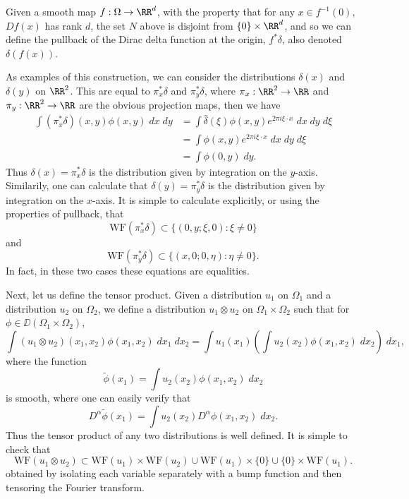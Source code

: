 \begin{example}
    Given a smooth map $f: \Omega \to \RR^d$, with the property that for any $x \in f^{-1}(0)$, $Df(x)$ has rank $d$, the set $N$ above is disjoint from $\{ 0 \} \times \RR^d$, and so we can define the pullback of the Dirac delta function at the origin, $f^* \delta$, also denoted $\delta(f(x))$.

    As examples of this construction, we can consider the distributions $\delta(x)$ and $\delta(y)$ on $\RR^2$. This are equal to $\pi_x^* \delta$ and $\pi_y^* \delta$, where $\pi_x: \RR^2 \to \RR$ and $\pi_y: \RR^2 \to \RR$ are the obvious projection maps, then we have
    \begin{align*}
        \int (\pi_x^* \delta)(x,y) \phi(x,y)\; dx\; dy &= \int \widehat{\delta}(\xi) \phi(x,y) e^{2 \pi i \xi \cdot x}\; dx\; dy\; d\xi\\
        &= \int \phi(x,y) e^{2 \pi i \xi \cdot x}\; dx\; dy\; d\xi\\
        &= \int \phi(0,y)\; dy.
    \end{align*}
    Thus $\delta(x) = \pi_x^* \delta$ is the distribution given by integration on the $y$-axis. Similarily, one can calculate that $\delta(y) = \pi_y^* \delta$ is the distribution given by integration on the $x$-axis. It is simple to calculate explicitly, or using the properties of pullback, that
    \[ \text{WF}(\pi_x^* \delta) \subset \{ (0,y;\xi,0) : \xi \neq 0 \} \]
    and
    \[ \text{WF}(\pi_y^* \delta) \subset \{ (x,0;0,\eta): \eta \neq 0 \}. \]
    In fact, in these two cases these equations are equalities.
\end{example}

Next, let us define the tensor product. Given a distribution $u_1$ on $\Omega_1$ and a distribution $u_2$ on $\Omega_2$, we define a distribution $u_1 \otimes u_2$ on $\Omega_1 \times \Omega_2$ such that for $\phi \in \DD(\Omega_1 \times \Omega_2)$,
%
\[ \int (u_1 \otimes u_2)(x_1,x_2) \phi(x_1,x_2)\; dx_1\; dx_2 = \int u_1(x_1) \left( \int u_2(x_2) \phi(x_1,x_2)\; dx_2 \right)\; dx_1, \]
%
where the function
%
\[ \tilde{\phi}(x_1) = \int u_2(x_2) \phi(x_1,x_2)\; dx_2 \]
%
is smooth, where one can easily verify that
%
\[ D^\alpha \tilde{\phi}(x_1) = \int u_2(x_2) D^\alpha \phi(x_1,x_2)\; dx_2. \]
%
Thus the tensor product of any two distributions is well defined. It is simple to check that
%
\[ \text{WF}(u_1 \otimes u_2) \subset \text{WF}(u_1) \times \text{WF}(u_2) \cup \text{WF}(u_1) \times \{ 0 \} \cup \{ 0 \} \times \text{WF}(u_1). \]
%
obtained by isolating each variable separately with a bump function and then tensoring the Fourier transform.

